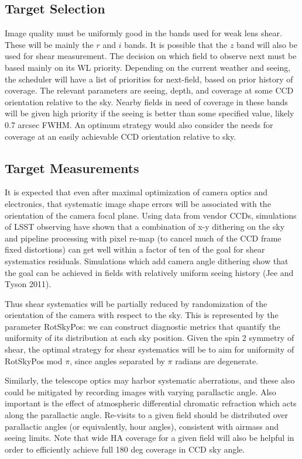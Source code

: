 \subsection{Target Selection}

Image quality must be uniformly good in the bands used for weak lens shear.
These will be mainly the $r$ and $i$ bands. It is possible that the $z$ band
will also be used for shear measurement.  The decision on which field to observe
next must be based mainly on its WL priority.  Depending on the current weather
and seeing, the scheduler will have a list of priorities for next-field, based
on prior history of coverage.  The relevant parameters are seeing, depth, and
coverage at some CCD orientation relative to the sky.  Nearby fields in need of
coverage in these bands will be given high priority if the seeing is better than
some specified value, likely 0.7 arcsec FWHM. An optimum strategy would also
consider the needs for coverage at an easily achievable CCD orientation relative
to sky.


\subsection{Target Measurements}

It is expected that even after maximal optimization of camera optics and
electronics, that systematic image shape errors will be associated with the
orientation of the camera focal plane.  Using data from vendor CCDs, simulations
of LSST observing have shown that a combination of x-y dithering on the sky and
pipeline processing with pixel re-map (to cancel much of the CCD frame fixed
distortions) can get well within a factor of ten of the goal for shear
systematics residuals.  Simulations which add camera angle dithering show that
the goal can be achieved in fields with relatively uniform seeing history (Jee
and Tyson 2011).

Thus shear systematics will be partially reduced by randomization of the
orientation of the camera with respect to the sky.  This is represented by the
parameter RotSkyPos: we can construct diagnostic metrics that quantify the
uniformity of its distribution at each sky position.   Given the spin 2 symmetry
of shear, the optimal strategy for shear systematics will be to aim for
uniformity of RotSkyPos mod $\pi$, since angles separated by $\pi$ radians are
degenerate.

Similarly, the telescope optics may harbor systematic aberrations, and these
also could be mitigated by recording images with varying parallactic angle.
Also important is the effect of atmospheric differential chromatic refraction
which acts along the parallactic angle.  Re-visits to a given field should be
distributed over parallactic angles (or equivalently, hour angles), consistent
with airmass and seeing limits.  Note that wide HA coverage for a given field
will also  be helpful in order to efficiently achieve full 180 deg coverage in
CCD sky angle.

